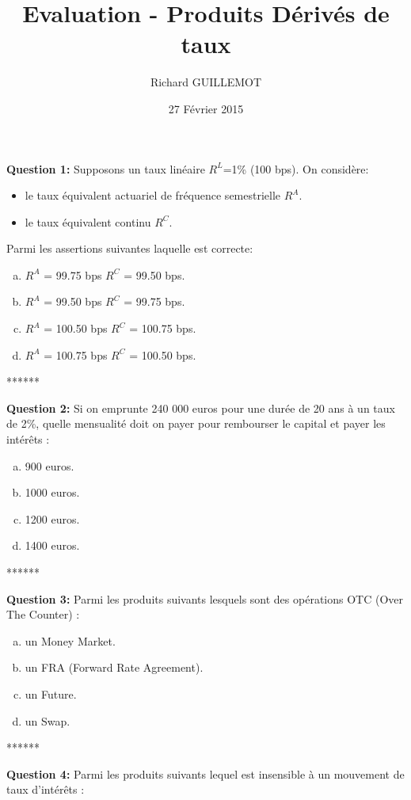 \documentclass{article}
\newcommand{\indentitem}{\setlength\itemindent{25pt}}
\begin{document}
\title{Evaluation - Produits Dérivés de taux}
\date{27 Février 2015}
\author{Richard GUILLEMOT}
\maketitle

\textbf{Question 1:} Supposons un taux linéaire $R^L$=1\% (100 bps). On considère: 
\begin{itemize}
	\indentitem \item le taux équivalent actuariel de fréquence semestrielle $R^A$.
	\indentitem \item le taux équivalent continu $R^C$.
\end{itemize}
\vspace{0.2cm}
Parmi les assertions suivantes laquelle est correcte:
\begin{enumerate}[a)]
\indentitem \item $R^A$ = 99.75 bps $R^C$ = 99.50 bps.
\indentitem \item $R^A$ = 99.50 bps $R^C$ = 99.75 bps.
\indentitem \item $R^A$ = 100.50 bps $R^C$ = 100.75 bps.
\indentitem \item $R^A$ = 100.75 bps $R^C$ = 100.50 bps.
\end{enumerate}
\smallskip
\centerline{******}
\smallskip
\textbf{Question 2:}
Si on emprunte 240 000 euros pour une durée de 20 ans à un taux de 2\%, quelle mensualité doit on payer pour rembourser le capital et payer les intérêts :
\begin{enumerate}[a)]
\indentitem \item 900 euros.
\indentitem \item 1000 euros.
\indentitem \item 1200 euros.
\indentitem \item 1400 euros.
\end{enumerate}
\smallskip
\centerline{******}
\smallskip
\textbf{Question 3:}
Parmi les produits suivants lesquels sont des opérations OTC (Over The Counter) :
\begin{enumerate}[a)]
\indentitem \item un Money Market.
\indentitem \item un FRA (Forward Rate Agreement).
\indentitem \item un Future.
\indentitem \item un Swap.
\end{enumerate}
\newpage
\smallskip
\centerline{******}
\smallskip
\textbf{Question 4:}
Parmi les produits suivants lequel est insensible à un mouvement de taux d’intérêts :
\end{document}
